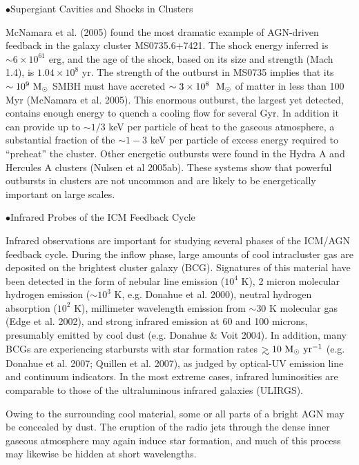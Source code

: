 \documentclass[letterpaper,12pt]{article}
\def\gae{\mathrel{>\kern-1.0em\lower0.9ex\hbox{$\sim$}}}
\def\msun{\ifmmode{\ {\rm M}_\odot}\else{$ {\rm M}_\odot$}\fi}
\def\msunyr{\ifmmode{\msun \ {\rm yr}^{-1}}\else{$\msun \ {\rm 
yr}^{-1}$}\fi}
\begin{document}
\vspace{0.5cm}\noindent$\bullet${\sc Supergiant Cavities and Shocks in Clusters}


McNamara et al. (2005) found the most dramatic example of AGN-driven feedback in
the galaxy cluster MS0735.6+7421.  The shock energy inferred 
is $\sim 6\times 10^{61}$ erg, and the age of the shock, based on its
size and strength (Mach 1.4), is $1.04 \times 10^8$ yr. The strength of the
outburst in MS0735 implies that its $\sim 10^9\msun$ SMBH must have
accreted $\sim 3\times 10^8~\msun$ of matter in less than 100 Myr (McNamara et al. 2005).
This enormous outburst, the largest yet detected, contains enough
energy to quench a cooling flow for several Gyr.  In addition
it can provide up to $\sim 1/3$ keV per particle
of heat to the gaseous atmosphere, a substantial fraction
of the $\sim 1-3$ keV per particle of excess energy required
to ``preheat'' the cluster.  Other energetic outbursts were found 
in the Hydra A and Hercules A clusters (Nulsen et al 2005ab).  These systems show 
that powerful outbursts in clusters
are not uncommon and are likely to be energetically important
on large scales.  


\vspace{0.5cm}\noindent$\bullet${\sc Infrared Probes of the ICM Feedback Cycle}

Infrared observations are important for
studying several phases of the ICM/AGN feedback cycle.  During the
inflow phase, large amounts of cool intracluster gas are deposited on
the brightest cluster galaxy (BCG).  Signatures of this material have
been detected in the form of nebular line emission ($10^4$ K), 2 micron
molecular hydrogen emission ($\sim 10^3$ K, e.g. Donahue et al. 2000), neutral hydrogen
absorption ($10^2$ K), millimeter wavelength emission from $\sim 30$ K
molecular gas (Edge et al. 2002), and strong infrared emission at 60 and 100 microns,
presumably emitted by cool dust (e.g. Donahue \& Voit 2004).  In addition, many BCGs are
experiencing starbursts with star formation rates $\gae 10 \msunyr$ (e.g. Donahue
et al. 2007; Quillen et al. 2007),
as judged by optical-UV emission line and continuum indicators.  In
the most extreme cases, infrared luminosities are comparable to those of the
ultraluminous infrared galaxies (ULIRGS).  


Owing to the surrounding cool material, some or all parts of a
bright AGN may be concealed by dust.  The eruption of the radio
jets through the dense inner gaseous atmosphere may again induce star
formation, and much of this process may likewise be hidden at short
wavelengths.  
\end{document}
